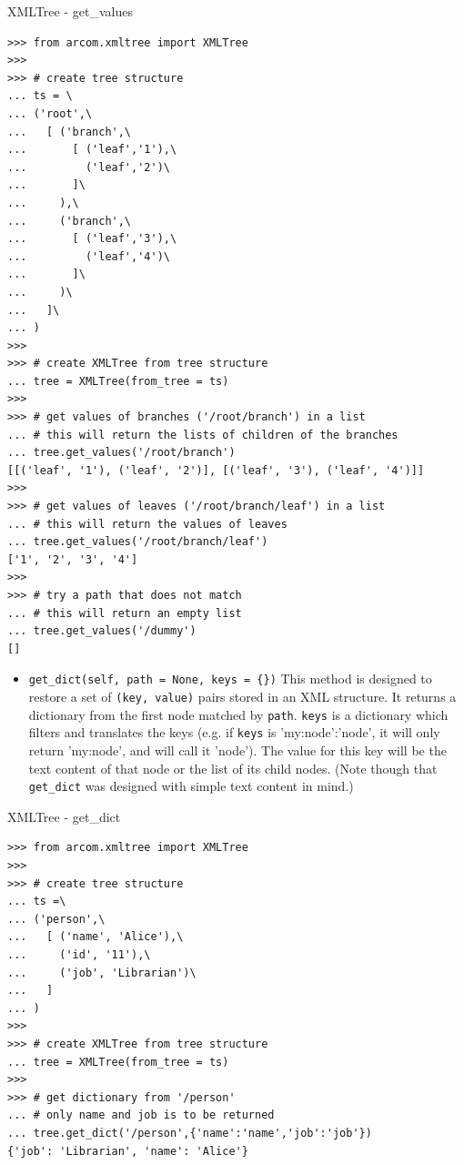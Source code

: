 \documentclass{article}
\begin{document}
\begin{flushleft}
\begin{itemize}
{    \begin{example}
      \caption{XMLTree - get\_values}\label{xtgetvals}
\begin{verbatim}
>>> from arcom.xmltree import XMLTree
>>> 
>>> # create tree structure
... ts = \
... ('root',\
...   [ ('branch',\
...       [ ('leaf','1'),\
...         ('leaf','2')\
...       ]\
...     ),\
...     ('branch',\
...       [ ('leaf','3'),\
...         ('leaf','4')\
...       ]\
...     )\
...   ]\
... )
>>> 
>>> # create XMLTree from tree structure
... tree = XMLTree(from_tree = ts)
>>> 
>>> # get values of branches ('/root/branch') in a list
... # this will return the lists of children of the branches
... tree.get_values('/root/branch')
[[('leaf', '1'), ('leaf', '2')], [('leaf', '3'), ('leaf', '4')]]
>>> 
>>> # get values of leaves ('/root/branch/leaf') in a list
... # this will return the values of leaves
... tree.get_values('/root/branch/leaf')
['1', '2', '3', '4']
>>> 
>>> # try a path that does not match
... # this will return an empty list
... tree.get_values('/dummy')
[]
\end{verbatim}
    \end{example}

    \begin{itemize}
      \item{ \verb$get_dict(self, path = None, keys = {})$ \linebreak
      This method is designed to restore a set of \verb$(key, value)$ pairs stored 
      in an XML structure. It returns a dictionary from the first node matched by \verb$path$.
      \verb$keys$ is a dictionary which filters and translates the keys
      (e.g. if \verb$keys$ is {'my:node':'node'}, it will only return
      'my:node', and will call it 'node'). The value for this key will be 
      the text content of that node or the list of its child nodes.
      (Note though that \verb$get_dict$ was designed with simple text content in mind.)
      }
    \end{itemize}

    \begin{example}
      \caption{XMLTree - get\_dict}\label{xtgetdict}
\begin{verbatim}
>>> from arcom.xmltree import XMLTree
>>> 
>>> # create tree structure
... ts =\
... ('person',\
...   [ ('name', 'Alice'),\
...     ('id', '11'),\
...     ('job', 'Librarian')\
...   ]
... )
>>> 
>>> # create XMLTree from tree structure
... tree = XMLTree(from_tree = ts)
>>> 
>>> # get dictionary from '/person'
... # only name and job is to be returned
... tree.get_dict('/person',{'name':'name','job':'job'})
{'job': 'Librarian', 'name': 'Alice'}
\end{verbatim}
    \end{example}

}
\end{itemize}
\end{flushleft}
\end{document}
